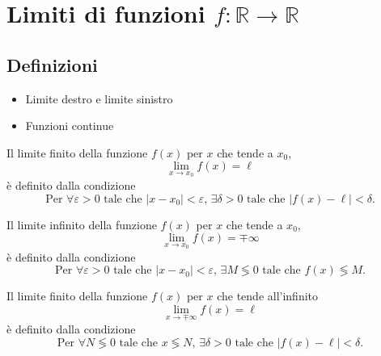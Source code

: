 

\chapter{Limiti di funzioni $f:\mathbb{R} \rightarrow \mathbb{R}$}

\section{Definizioni}
{\color{red}
\begin{itemize}
    \item Limite destro e limite sinistro
    \item Funzioni continue
\end{itemize}
}
\begin{definition} Il limite finito della funzione $f(x)$  per $x$ che tende a $x_0$,
    \begin{equation}
      \lim_{x \rightarrow x_0} f(x) = \ell
    \end{equation}
    è definito dalla condizione
    \begin{equation}
        \text{Per $\forall \varepsilon > 0$ tale che $|x-x_0| < \varepsilon$, $\exists \delta > 0$ tale che $|f(x) - \ell|< \delta$.}
    \end{equation}
\end{definition}
\begin{definition} Il limite infinito della funzione $f(x)$  per $x$ che tende a $x_0$,
    \begin{equation}
      \lim_{x \rightarrow x_0} f(x) = \mp \infty
    \end{equation}
    è definito dalla condizione
    \begin{equation}
        \text{Per $\forall \varepsilon > 0$ tale che $|x-x_0| < \varepsilon$, $\exists M \lessgtr 0$ tale che $f(x) \lessgtr M$.}
    \end{equation}
\end{definition}
\begin{definition} Il limite finito della funzione $f(x)$ per $x$ che tende all'infinito
    \begin{equation}
      \lim_{x \rightarrow \mp \infty} f(x) = \ell
    \end{equation}
    è definito dalla condizione
    \begin{equation}
        \text{Per $\forall N \lessgtr 0$ tale che $x \lessgtr  N$, $\exists \delta > 0$ tale che $|f(x) - \ell| < \delta$.}
    \end{equation}
\end{definition}
